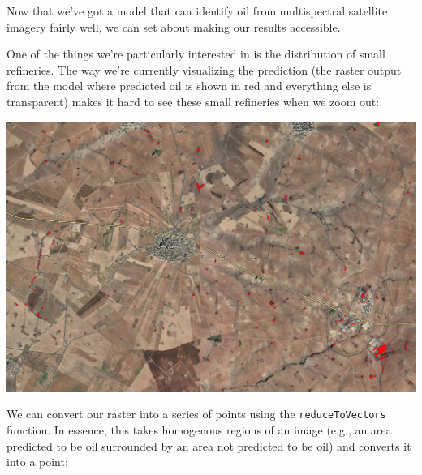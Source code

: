 \documentclass[
  letterpaper,
  DIV=11,
  numbers=noendperiod]{scrreprt}
\begin{document}

Now that we've got a model that can identify oil from multispectral
satellite imagery fairly well, we can set about making our results
accessible.

One of the things we're particularly interested in is the distribution
of small refineries. The way we're currently visualizing the prediction
(the raster output from the model where predicted oil is shown in red
and everything else is transparent) makes it hard to see these small
refineries when we zoom out:

\includegraphics{./images/big_red.png}

We can convert our raster into a series of points using the
\texttt{reduceToVectors} function. In essence, this takes homogenous
regions of an image (e.g., an area predicted to be oil surrounded by an
area not predicted to be oil) and converts it into a point:
\end{document}
